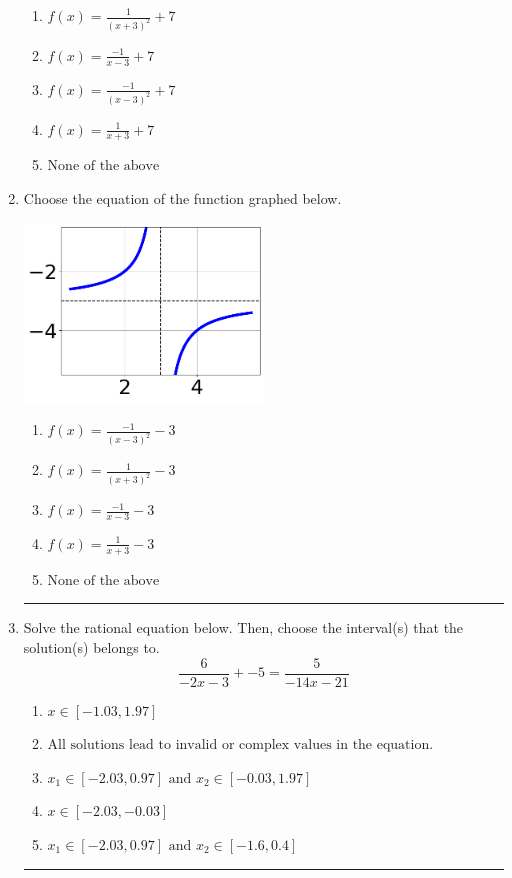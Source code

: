 \documentclass[14pt]{extbook}
\newcommand{\litem}[1]{\item#1\hspace*{-1cm}\rule{\textwidth}{0.4pt}}
\begin{document}
\begin{enumerate}
{\begin{center}
\end{center}
\begin{enumerate}[label=\Alph*.]
\item \( f(x) = \frac{1}{(x + 3)^2} + 7 \)
\item \( f(x) = \frac{-1}{x - 3} + 7 \)
\item \( f(x) = \frac{-1}{(x - 3)^2} + 7 \)
\item \( f(x) = \frac{1}{x + 3} + 7 \)
\item \( \text{None of the above} \)

\end{enumerate} }
\litem{
Choose the equation of the function graphed below.
\begin{center}
    \includegraphics[width=0.5\textwidth]{../Figures/rationalGraphToEquationCopyA.png}
\end{center}
\begin{enumerate}[label=\Alph*.]
\item \( f(x) = \frac{-1}{(x - 3)^2} - 3 \)
\item \( f(x) = \frac{1}{(x + 3)^2} - 3 \)
\item \( f(x) = \frac{-1}{x - 3} - 3 \)
\item \( f(x) = \frac{1}{x + 3} - 3 \)
\item \( \text{None of the above} \)

\end{enumerate} }
\litem{
Solve the rational equation below. Then, choose the interval(s) that the solution(s) belongs to.\[ \frac{6}{-2x -3} + -5 = \frac{5}{-14x -21} \]\begin{enumerate}[label=\Alph*.]
\item \( x \in [-1.03,1.97] \)
\item \( \text{All solutions lead to invalid or complex values in the equation.} \)
\item \( x_1 \in [-2.03, 0.97] \text{ and } x_2 \in [-0.03,1.97] \)
\item \( x \in [-2.03,-0.03] \)
\item \( x_1 \in [-2.03, 0.97] \text{ and } x_2 \in [-1.6,0.4] \)


\end{enumerate}}
\end{enumerate}
\end{document}
